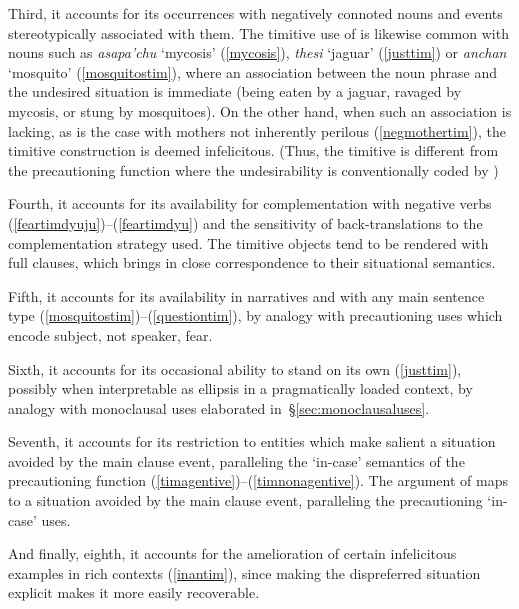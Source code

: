 \documentclass[output=paper,colorlinks,citecolor=brown]{langscibook}
\begin{document}
Third, it accounts for its occurrences with negatively connoted nouns and events stereotypically associated with them. The timitive use of  is likewise common with nouns such as \emph{asapa'chu} `mycosis' (\ref{mycosis}), \emph{thesi} `jaguar' (\ref{justtim}) or \emph{anchan} `mosquito' (\ref{mosquitostim}), where an association between the noun phrase and the undesired situation is immediate (\ie being eaten by a jaguar, ravaged by mycosis, or stung by mosquitoes). On the other hand, when such an association is lacking, as is the case with mothers not inherently perilous (\ref{negmothertim}), the timitive construction is deemed infelicitous. (Thus, the timitive is different from the precautioning function where the undesirability is conventionally coded by \sane[.])


Fourth, it accounts for its availability for complementation with negative verbs (\ref{feartimdyuju})--(\ref{feartimdyu}) and the sensitivity of back-translations to the complementation strategy used. The timitive objects tend to be rendered with full clauses, which brings in close correspondence to their situational semantics.
    
Fifth, it accounts for its availability in narratives and with any main sentence type (\ref{mosquitostim})--(\ref{questiontim}), by analogy with precautioning uses which encode subject, not speaker, fear.

Sixth, it accounts for its occasional ability to stand on its own (\ref{justtim}), possibly when interpretable as ellipsis in a pragmatically loaded context, by analogy with monoclausal uses elaborated in~\S\ref{sec:monoclausaluses}. 

Seventh, it accounts for its restriction to {entities which make salient a situation avoided by the main clause event, paralleling the `in-case' semantics of the precautioning function (\ref{timagentive})--(\ref{timnonagentive}). The argument of  maps to a situation avoided by the main clause event, paralleling the precautioning `in-case' uses.}

And finally, eighth, it accounts for the amelioration of certain infelicitous examples in rich contexts (\ref{inantim}), since making the dispreferred situation explicit makes it more easily recoverable.



\end{document}
